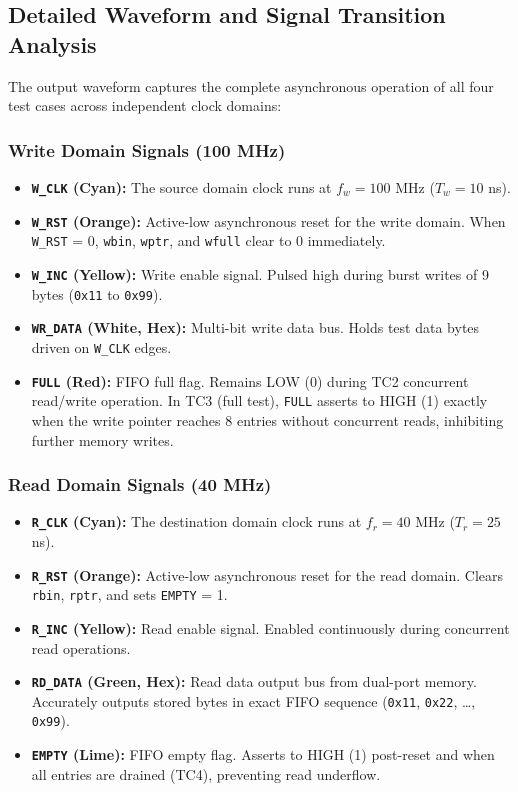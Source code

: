 \documentclass[12pt,a4paper]{article}
\begin{document}
\subsection{Detailed Waveform and Signal Transition Analysis}

The output waveform captures the complete asynchronous operation of all four test cases across independent clock domains:

\subsubsection{Write Domain Signals (100 MHz)}
\begin{itemize}
    \item \textbf{\texttt{W\_CLK} (Cyan):} The source domain clock runs at $f_w = 100$ MHz ($T_w = 10$ ns).
    \item \textbf{\texttt{W\_RST} (Orange):} Active-low asynchronous reset for the write domain. When \texttt{W\_RST} = 0, \texttt{wbin}, \texttt{wptr}, and \texttt{wfull} clear to 0 immediately.
    \item \textbf{\texttt{W\_INC} (Yellow):} Write enable signal. Pulsed high during burst writes of 9 bytes (\texttt{0x11} to \texttt{0x99}).
    \item \textbf{\texttt{WR\_DATA} (White, Hex):} Multi-bit write data bus. Holds test data bytes driven on \texttt{W\_CLK} edges.
    \item \textbf{\texttt{FULL} (Red):} FIFO full flag. Remains LOW (0) during TC2 concurrent read/write operation. In TC3 (full test), \texttt{FULL} asserts to HIGH (1) exactly when the write pointer reaches 8 entries without concurrent reads, inhibiting further memory writes.
\end{itemize}

\subsubsection{Read Domain Signals (40 MHz)}
\begin{itemize}
    \item \textbf{\texttt{R\_CLK} (Cyan):} The destination domain clock runs at $f_r = 40$ MHz ($T_r = 25$ ns).
    \item \textbf{\texttt{R\_RST} (Orange):} Active-low asynchronous reset for the read domain. Clears \texttt{rbin}, \texttt{rptr}, and sets \texttt{EMPTY} = 1.
    \item \textbf{\texttt{R\_INC} (Yellow):} Read enable signal. Enabled continuously during concurrent read operations.
    \item \textbf{\texttt{RD\_DATA} (Green, Hex):} Read data output bus from dual-port memory. Accurately outputs stored bytes in exact FIFO sequence (\texttt{0x11}, \texttt{0x22}, \dots, \texttt{0x99}).
    \item \textbf{\texttt{EMPTY} (Lime):} FIFO empty flag. Asserts to HIGH (1) post-reset and when all entries are drained (TC4), preventing read underflow.
\end{itemize}
\end{document}
